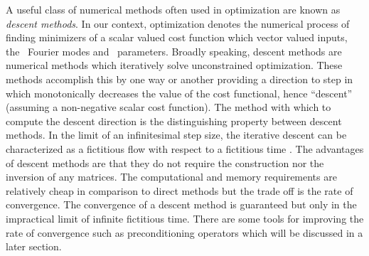 
A useful class of numerical methods often used in optimization are known
as \textit{descent methods}. In our context, optimization denotes the numerical process
of finding minimizers of a scalar valued cost function which vector valued inputs, the \spt\
Fourier modes and \spt\ parameters. Broadly speaking, descent methods are numerical methods
which iteratively solve unconstrained optimization. These methods accomplish this by one
way or another providing a direction to step in which monotonically decreases the value of
the cost functional, hence ``descent'' (assuming a non-negative scalar cost function).
The method with which to compute the descent direction is the distinguishing property
between descent methods. In the limit of an infinitesimal step size, the iterative descent
can be characterized as a fictitious flow with respect to a fictitious time \rf{LCC06}.
The advantages of descent methods are that they do not require the construction nor
the inversion of any matrices. The computational and memory requirements
are relatively cheap in comparison to direct methods but the trade off is the
rate of convergence. The convergence of a descent method
is guaranteed but only in the impractical limit of infinite fictitious time.
There are some tools for improving the rate of convergence such as preconditioning
operators which will be discussed in a later section.

